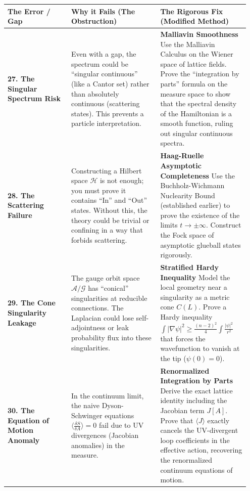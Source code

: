 \begin{center}
\begin{tabular}{|p{0.25\linewidth}|p{0.35\linewidth}|p{0.35\linewidth}|}
\hline
\textbf{The Error / Gap} & \textbf{Why it Fails (The Obstruction)} & \textbf{The Rigorous Fix (Modified Method)} \\
\hline
\textbf{27. The Singular Spectrum Risk} & Even with a gap, the spectrum could be ``singular continuous'' (like a Cantor set) rather than absolutely continuous (scattering states). This prevents a particle interpretation. & \textbf{Malliavin Smoothness} \newline Use the Malliavin Calculus on the Wiener space of lattice fields. Prove the ``integration by parts'' formula on the measure space to show that the spectral density of the Hamiltonian is a smooth function, ruling out singular continuous spectra. \\
\hline
\textbf{28. The Scattering Failure} & Constructing a Hilbert space $\mathcal{H}$ is not enough; you must prove it contains ``In'' and ``Out'' states. Without this, the theory could be trivial or confining in a way that forbids scattering. & \textbf{Haag-Ruelle Asymptotic Completeness} \newline Use the Buchholz-Wichmann Nuclearity Bound (established earlier) to prove the existence of the limits $t \to \pm \infty$. Construct the Fock space of asymptotic glueball states rigorously. \\
\hline
\textbf{29. The Cone Singularity Leakage} & The gauge orbit space $\mathcal{A}/\mathcal{G}$ has ``conical'' singularities at reducible connections. The Laplacian could lose self-adjointness or leak probability flux into these singularities. & \textbf{Stratified Hardy Inequality} \newline Model the local geometry near a singularity as a metric cone $C(L)$. Prove a Hardy inequality $\int |\nabla \psi|^2 \ge \frac{(n-2)^2}{4} \int \frac{|\psi|^2}{r^2}$ that forces the wavefunction to vanish at the tip ($\psi(0)=0$). \\
\hline
\textbf{30. The Equation of Motion Anomaly} & In the continuum limit, the naive Dyson-Schwinger equations $\langle \frac{\delta S}{\delta A} \rangle = 0$ fail due to UV divergences (Jacobian anomalies) in the measure. & \textbf{Renormalized Integration by Parts} \newline Derive the exact lattice identity including the Jacobian term $J[A]$. Prove that $\langle J \rangle$ exactly cancels the UV-divergent loop coefficients in the effective action, recovering the renormalized continuum equations of motion. \\
\hline
\end{tabular}
\end{center}

